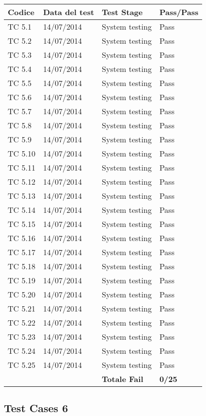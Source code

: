 \begin{tabular}{|p{3cm}|p{3cm}|p{3cm}|p{3cm}|}
	\hline
	\rowcolor{Gray}
	\textbf{Codice} & \textbf{Data del test} & \textbf{Test Stage} & \textbf{Pass/Pass}\tabularnewline
	\hline
	TC 5.1			& 14/07/2014 			& System testing		& Pass \tabularnewline
	\hline
	TC 5.2			& 14/07/2014 			& System testing		& Pass \tabularnewline
	\hline
	TC 5.3			& 14/07/2014 			& System testing		& Pass \tabularnewline
	\hline
	TC 5.4			& 14/07/2014 			& System testing		& Pass \tabularnewline
	\hline
	TC 5.5			& 14/07/2014 			& System testing		& Pass \tabularnewline
	\hline
	TC 5.6			& 14/07/2014 			& System testing		& Pass \tabularnewline
	\hline
	TC 5.7			& 14/07/2014 			& System testing		& Pass \tabularnewline
	\hline
	TC 5.8			& 14/07/2014 			& System testing		& Pass \tabularnewline
	\hline
	TC 5.9			& 14/07/2014 			& System testing		& Pass \tabularnewline
	\hline
	TC 5.10			& 14/07/2014 			& System testing		& Pass \tabularnewline
	\hline
	TC 5.11			& 14/07/2014 			& System testing		& Pass \tabularnewline
	\hline
	TC 5.12			& 14/07/2014 			& System testing		& Pass \tabularnewline
	\hline
	TC 5.13			& 14/07/2014 			& System testing		& Pass \tabularnewline
	\hline
	TC 5.14			& 14/07/2014 			& System testing		& Pass \tabularnewline
	\hline
	TC 5.15			& 14/07/2014 			& System testing		& Pass \tabularnewline
	\hline
	TC 5.16			& 14/07/2014 			& System testing		& Pass \tabularnewline
	\hline
	TC 5.17			& 14/07/2014 			& System testing		& Pass \tabularnewline
	\hline
	TC 5.18			& 14/07/2014 			& System testing		& Pass \tabularnewline
	\hline
	TC 5.19			& 14/07/2014 			& System testing		& Pass \tabularnewline
	\hline
	TC 5.20			& 14/07/2014 			& System testing		& Pass \tabularnewline
	\hline
	TC 5.21			& 14/07/2014 			& System testing		& Pass \tabularnewline
	\hline
	TC 5.22			& 14/07/2014 			& System testing		& Pass \tabularnewline
	\hline
	TC 5.23			& 14/07/2014 			& System testing		& Pass \tabularnewline
	\hline
	TC 5.24			& 14/07/2014 			& System testing		& Pass \tabularnewline
	\hline
	TC 5.25			& 14/07/2014 			& System testing		& Pass \tabularnewline
	\hline
					& 						& \textbf{Totale Fail}	& \textbf{0/25} \tabularnewline
	\hline
\end{tabular}

\subsection{Test Cases 6}

